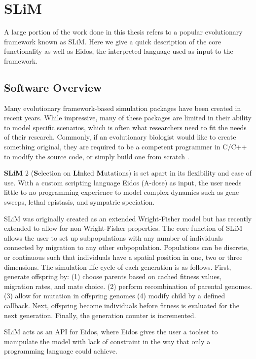 \documentclass{article}
\begin{document}
\section{SLiM}

A large portion of the work done in this thesis refers to a popular evolutionary framework known as SLiM.
Here we give a quick description of the core functionality as well as Eidos,  the interpreted language used as input to the framework.

\subsection{Software Overview}

Many evolutionary framework-based simulation packages have been created in recent years.  
While impressive, many of these packages are limited in their ability to model specific scenarios,
which is often what researchers need to fit the needs of their research. 
Commonly, if an evolutionary biologist would like to create something original, 
they are required to be a competent programmer in C/C++ to modify the source code, 
or simply build one from scratch \cite{Haller2017}.

\textbf{SLiM} 2 (\textbf{S}election on \textbf{Li}nked \textbf{M}utations) is set apart in its flexibility and ease of use. 
With a custom scripting language Eidos (A-dose) as input, the user needs little to no programming experience to model complex
dynamics such as gene sweeps, lethal epistasis, and sympatric speciation. 

SLiM was originally created as an extended Wright-Fisher model but has recently extended to allow for non Wright-Fisher properties.
The core function of SLiM allows the user to set up subpopulations with any number of individuals connected by migration to any other subpopulation. 
Populations can be discrete, or continuous such that individuals have a spatial position in one, two or three dimensions. 
The simulation life cycle of each generation is as follows.
First, 
generate offspring by:
(1) choose parents based on cached fitness values, migration rates, and mate choice.
(2) perform recombination of parental genomes.
(3) allow for mutation in offspring genomes
(4) modify child by a defined callback. 
Next, 
offspring become individuals before fitness is evaluated for the next generation.
Finally,
the generation counter is incremented. 

SLiM acts as an API for Eidos, where Eidos gives the user a toolset to 
manipulate the model with lack of constraint in the way that only a programming language could achieve. 
\end{document}
